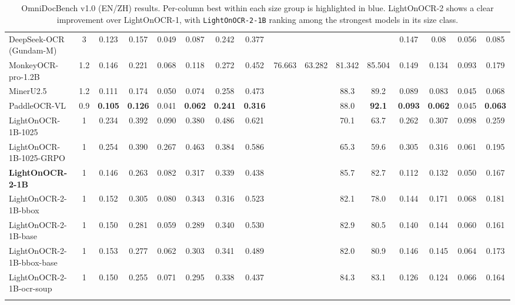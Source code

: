 \documentclass{article}
\newcommand{\bestA}[1]{\cellcolor{blue!12}\textbf{#1}}  %
\begin{document}
\begin{table}[h!]
\begin{adjustbox}{max width=\linewidth, keepaspectratio}
\begin{tabular}{l c c c c c c c c c c c c c c c}
DeepSeek-OCR (Gundam-M) & 3 & 0.123 & 0.157 & 0.049 & 0.087 & 0.242 & 0.377 &  &  &  &  & 0.147 & 0.08 & 0.056 & 0.085 \\
MonkeyOCR-pro-1.2B & 1.2 & 0.146 & 0.221 & 0.068 & 0.118 & 0.272 & 0.452 & 76.663 & 63.282 & 81.342 & 85.504 & 0.149 & 0.134 & 0.093 & 0.179 \\
MinerU2.5 & 1.2 & 0.111 & 0.174 & 0.050 & 0.074 & 0.258 & 0.473 &  &  & 88.3 & 89.2 & 0.089 & 0.083 & 0.045 & 0.068 \\
PaddleOCR-VL & 0.9 & \bestA{0.105} & \bestA{0.126} & 0.041 & \bestA{0.062} & \bestA{0.241} & \bestA{0.316} &  &  & 88.0 & \bestA{92.1} & \bestA{0.093} & \bestA{0.062} & 0.045 & \bestA{0.063} \\
\midrule
LightOnOCR-1B-1025 & 1 & 0.234 & 0.392 & 0.090 & 0.380 & 0.486 & 0.621 &  &  & 70.1 & 63.7 & 0.262 & 0.307 & 0.098 & 0.259 \\
LightOnOCR-1B-1025-GRPO & 1 & 0.254 & 0.390 & 0.267 & 0.463 & 0.384 & 0.586 &  &  & 65.3 & 59.6 & 0.305 & 0.316 & 0.061 & 0.195 \\
\midrule
\textbf{LightOnOCR-2-1B} & 1 & 0.146 & 0.263 & 0.082 & 0.317 & 0.339 & 0.438 &  &  & 85.7 & 82.7 & 0.112 & 0.132 & 0.050 & 0.167 \\
LightOnOCR-2-1B-bbox & 1 & 0.152 & 0.305 & 0.080 & 0.343 & 0.316 & 0.523 &  &  & 82.1 & 78.0 & 0.144 & 0.171 & 0.068 & 0.181 \\
LightOnOCR-2-1B-base & 1 & 0.150 & 0.281 & 0.059 & 0.289 & 0.340 & 0.530 &  &  & 82.9 & 80.5 & 0.140 & 0.144 & 0.060 & 0.161 \\
LightOnOCR-2-1B-bbox-base & 1 & 0.153 & 0.277 & 0.062 & 0.303 & 0.341 & 0.489 &  &  & 82.0 & 80.9 & 0.146 & 0.145 & 0.064 & 0.173 \\
LightOnOCR-2-1B-ocr-soup & 1 & 0.150 & 0.255 & 0.071 & 0.295 & 0.338 & 0.437 &  &  & 84.3 & 83.1 & 0.126 & 0.124 & 0.066 & 0.164 \\
\bottomrule
\\
\end{tabular}
\end{adjustbox}
\caption{OmniDocBench v1.0 (EN/ZH) results. Per-column best within each size group is highlighted in blue. LightOnOCR-2 shows a clear improvement over LightOnOCR-1, with \texttt{LightOnOCR-2-1B} ranking among the strongest models in its size class.}
\label{omnidocbench}
\end{table}
\end{document}
